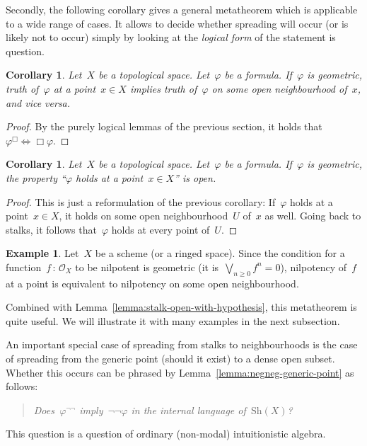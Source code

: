 \documentclass[10pt]{amsart}
\theoremstyle{definition}
\newtheorem{ex}[defn]{Example}
\theoremstyle{plain}
\newtheorem{cor}[defn]{Corollary}
\theoremstyle{remark}
\renewcommand{\O}{\mathcal{O}}
\newcommand{\Sh}{\mathrm{Sh}}
\newcommand{\?}{\,{:}\,}
\renewcommand{\_}{\mathpunct{.}\,}
\begin{document}
Secondly, the following corollary gives a general metatheorem which is
applicable to a wide range of cases. It allows to decide whether spreading will
occur (or is likely not to occur) simply by looking at the \emph{logical form}
of the statement is question.

\begin{cor}\label{cor:geometric-spreading}
Let~$X$ be a topological space. Let~$\varphi$ be a formula.
If~$\varphi$ is geometric, truth of~$\varphi$ at a point~$x \in X$ implies
truth of~$\varphi$ on some open neighbourhood of~$x$, and vice versa.\end{cor}
\begin{proof}By the purely logical lemmas of the previous section, it holds
that~$\varphi^\Box \Leftrightarrow \Box\varphi$.
\end{proof}

\begin{cor}
Let~$X$ be a topological space. Let~$\varphi$ be a formula.
If~$\varphi$ is geometric, the property ``$\varphi$ holds at a point~$x \in
X$'' is open.
\end{cor}
\begin{proof}This is just a reformulation of the previous corollary:
If~$\varphi$ holds at a point~$x \in X$, it holds on some open
neighbourhood~$U$ of~$x$ as well. Going back to stalks, it follows
that~$\varphi$ holds at every point of~$U$.\end{proof}

\begin{ex}Let~$X$ be a scheme (or a ringed space). Since the condition for a
function~$f\?\O_X$ to be nilpotent is geometric (it is~$\bigvee_{n \geq 0} f^n
= 0$), nilpotency of~$f$ at a point is equivalent to nilpotency on some open
neighbourhood.\end{ex}

Combined with Lemma~\ref{lemma:stalk-open-with-hypothesis}, this metatheorem is
quite useful. We will illustrate it with many examples in the next subsection.

An important special case of spreading from stalks to neighbourhoods is the
case of spreading from the generic point (should it exist) to a dense open
subset. Whether this occurs can be phrased by
Lemma~\ref{lemma:negneg-generic-point} as follows:
\begin{quote}
\emph{Does~$\varphi^{\neg\neg}$ imply~$\neg\neg\varphi$ in the internal language
of~$\Sh(X)$?}
\end{quote}
This question is a question of ordinary (non-modal) intuitionistic algebra.
\end{document}
